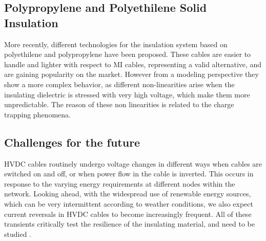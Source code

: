 \documentclass[11pt,a4paper]{article}
\begin{document}
\subsection{Polypropylene and Polyethilene Solid Insulation}
More recently, different technologies for the insulation system based on polyethilene and polypropylene have been proposed. These cables are easier to handle and lighter with respect to MI cables, representing a valid alternative, and are gaining popularity on the market. However from a modeling perspective they show a more complex behavior, as different non-linearities arise when the insulating dielectric is stressed with very high voltage, which make them more unpredictable. The reason of these non linearities is related to the charge trapping phenomena.
\subsection{Challenges for the future}
HVDC cables routinely undergo voltage changes in different ways when cables are switched on and off, or when power flow in the cable is inverted. This occurs in response to the varying energy requirements at different nodes within the network. Looking ahead, with the widespread use of renewable energy sources, which can be very intermittent according to weather conditions, we also expect current reversals in HVDC cables to become increasingly frequent. All of these transients critically test the resilience of the insulating material, and need to be studied \cite{hakonseththesis}.
\end{document}
